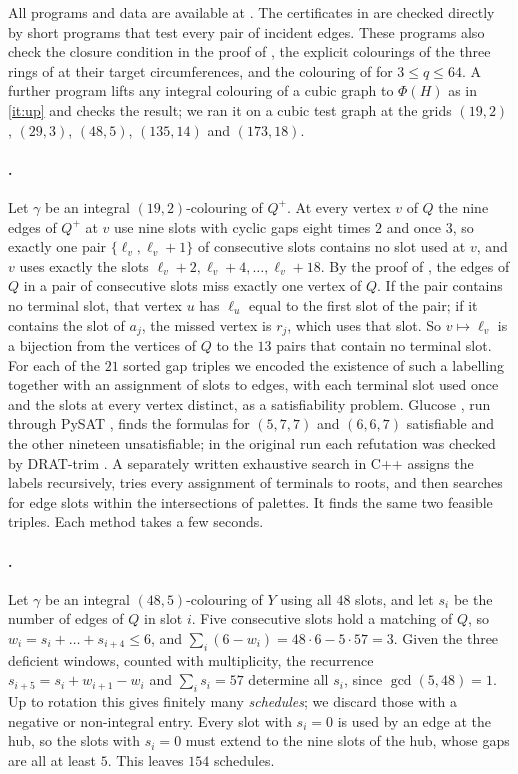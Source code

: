 \documentclass[11pt,colorlinks]{charlie}
\begin{document}
All programs and data are available at \coderepo. The certificates in  are checked directly by short programs that test every pair of incident edges. These programs also check the closure condition in the proof of , the explicit colourings of the three rings of  at their target circumferences, and the colouring of  for $3\le q\le64$. A further program lifts any integral colouring of a cubic graph to $\Phi(H)$ as in \ref{it:up} and checks the result; we ran it on a cubic test graph at the grids $(19,2)$, $(29,3)$, $(48,5)$, $(135,14)$ and $(173,18)$.

\paragraph{.}
Let $\gamma$ be an integral $(19,2)$-colouring of $Q^+$. At every vertex $v$ of $Q$ the nine edges of $Q^+$ at $v$ use nine slots with cyclic gaps eight times $2$ and once $3$, so exactly one pair $\{\ell_v,\ell_v+1\}$ of consecutive slots contains no slot used at $v$, and $v$ uses exactly the slots $\ell_v+2,\ell_v+4,\dots,\ell_v+18$. By the proof of , the edges of $Q$ in a pair of consecutive slots miss exactly one vertex of $Q$. If the pair contains no terminal slot, that vertex $u$ has $\ell_u$ equal to the first slot of the pair; if it contains the slot of $a_j$, the missed vertex is $r_j$, which uses that slot. So $v\mapsto\ell_v$ is a bijection from the vertices of $Q$ to the $13$ pairs that contain no terminal slot. For each of the $21$ sorted gap triples we encoded the existence of such a labelling together with an assignment of slots to edges, with each terminal slot used once and the slots at every vertex distinct, as a satisfiability problem. Glucose \cite{Glucose}, run through PySAT \cite{PySAT}, finds the formulas for $(5,7,7)$ and $(6,6,7)$ satisfiable and the other nineteen unsatisfiable; in the original run each refutation was checked by DRAT-trim \cite{DRATtrim}. A separately written exhaustive search in C++ assigns the labels recursively, tries every assignment of terminals to roots, and then searches for edge slots within the intersections of palettes. It finds the same two feasible triples. Each method takes a few seconds.

\paragraph{.}
Let $\gamma$ be an integral $(48,5)$-colouring of $Y$ using all $48$ slots, and let $s_i$ be the number of edges of $Q$ in slot $i$. Five consecutive slots hold a matching of $Q$, so $w_i=s_i+\dots+s_{i+4}\le6$, and $\sum_i(6-w_i)=48\cdot6-5\cdot57=3$. Given the three deficient windows, counted with multiplicity, the recurrence $s_{i+5}=s_i+w_{i+1}-w_i$ and $\sum_is_i=57$ determine all $s_i$, since $\gcd(5,48)=1$. Up to rotation this gives finitely many \emph{schedules}; we discard those with a negative or non-integral entry. Every slot with $s_i=0$ is used by an edge at the hub, so the slots with $s_i=0$ must extend to the nine slots of the hub, whose gaps are all at least $5$. This leaves $154$ schedules.
\end{document}
